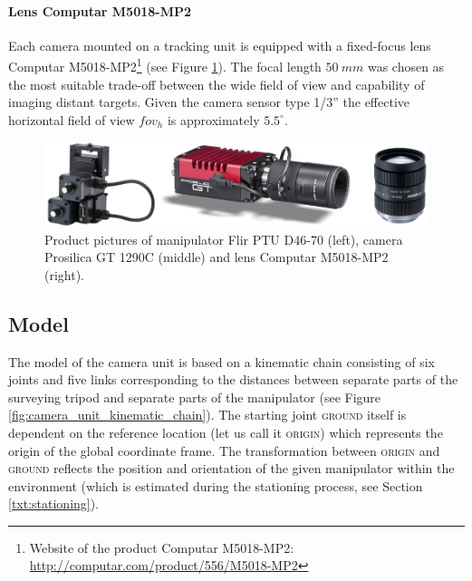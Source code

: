 \paragraph{Lens Computar M5018-MP2} Each camera mounted on a tracking unit is equipped with a fixed-focus lens Computar M5018-MP2\footnote{Website of the product Computar M5018-MP2: \url{http://computar.com/product/556/M5018-MP2}} (see Figure \ref{fig:prosilica_gt1290c_flir_ptud4670}). The focal length $50~mm$ was chosen as the most suitable trade-off between the wide field of view and capability of imaging distant targets. Given the camera sensor type 1/3'' the effective horizontal field of view $fov_{h}$ is approximately $5.5^{\circ}$.

\begin{figure}[htb]
	\centering
	\includegraphics[width=0.9\linewidth]{fig/prosilica_gt1290c_flir_ptud4670_computar.png}
	\caption{Product pictures of manipulator Flir PTU D46-70 (left), camera Prosilica GT 1290C (middle) and lens Computar M5018-MP2 (right).}
	\label{fig:prosilica_gt1290c_flir_ptud4670}
\end{figure}

\subsection{Model} \label{txt:model}

The model of the camera unit is based on a kinematic chain consisting of six joints and five links corresponding to the distances between separate parts of the surveying tripod and separate parts of the manipulator (see Figure \ref{fig:camera_unit_kinematic_chain}). The starting joint \textsc{ground} itself is dependent on the reference location (let us call it \textsc{origin}) which represents the origin of the global coordinate frame. The transformation between \textsc{origin} and \textsc{ground} reflects the position and orientation of the given manipulator within the environment (which is estimated during the stationing process, see Section \ref{txt:stationing}).

